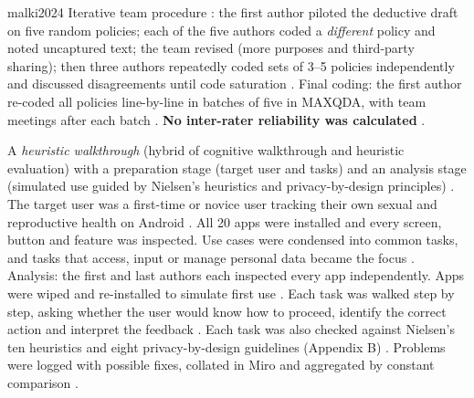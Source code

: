 \begin{papercard}{malki2024}
 Iterative team procedure : the first author piloted the deductive draft on five random policies; each of the five authors coded a \emph{different} policy and noted uncaptured text; the team revised (more purposes and third-party sharing); then three authors repeatedly coded sets of 3--5 policies independently and discussed disagreements until code saturation . Final coding: the first author re-coded all policies line-by-line in batches of five in MAXQDA, with team meetings after each batch . \textbf{No inter-rater reliability was calculated} .

 A \emph{heuristic walkthrough} (hybrid of cognitive walkthrough and heuristic evaluation) with a preparation stage (target user and tasks) and an analysis stage (simulated use guided by Nielsen's heuristics and privacy-by-design principles) . The target user was a first-time or novice user tracking their own sexual and reproductive health on Android . All 20 apps were installed and every screen, button and feature was inspected. Use cases were condensed into common tasks, and tasks that access, input or manage personal data became the focus . Analysis: the first and last authors each inspected every app independently. Apps were wiped and re-installed to simulate first use . Each task was walked step by step, asking whether the user would know how to proceed, identify the correct action and interpret the feedback . Each task was also checked against Nielsen's ten heuristics and eight privacy-by-design guidelines (Appendix B) . Problems were logged with possible fixes, collated in Miro and aggregated by constant comparison .


\end{papercard}

